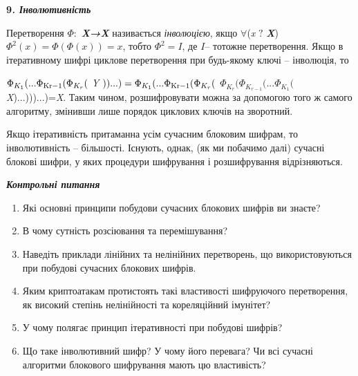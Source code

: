 \documentclass[a4paper]{article}
\newcommand\liststyleWWviiiNumxlviii{%
\renewcommand\theenumi{\arabic{enumi}}
\renewcommand\theenumii{\alph{enumii}}
\renewcommand\theenumiii{\roman{enumiii}}
\renewcommand\theenumiv{\arabic{enumiv}}
\renewcommand\labelenumi{\theenumi.}
\renewcommand\labelenumii{\theenumii.}
\renewcommand\labelenumiii{\theenumiii.}
\renewcommand\labelenumiv{\theenumiv.}
}
\newcounter{}
\newcommand\normalsubformula[1]{\text{\mathversion{normal}$#1$}}
\begin{document}
\bigskip

{\bfseries
9\textit{.  Інволютивність }}

Перетворення  ${\Phi :}$
\textbf{\textit{X}}\textbf{\textit{→}}\textbf{\textit{X}}\textbf{\textit{
}}називається \textit{інволюцією}, якщо  ${\forall }$(\textit{x} ${?}$
\textbf{\textit{X}})\textbf{\textit{ }} ${\Phi ^{{2}}(x)=\Phi (\Phi (x))=x}$,
тобто  ${\Phi ^{{2}}=I}$, де  ${I}$– тотожне перетворення. Якщо в ітеративному
шифрі циклове перетворення при будь-якому ключі – інволюція, то 

 ${\Phi _{{K_{{1}}}}(\text{.}\text{.}\text{.}\Phi
_{\normalsubformula{\text{Kr}}-1}{(\Phi _{K_{{r}}}}{(}}$ \textit{Y}
${))\text{.}\text{.}\text{.})=\Phi _{{K_{{1}}}}(\text{.}\text{.}\text{.}\Phi
_{\normalsubformula{\text{Kr}}-1}{(\Phi _{K_{{r}}}}{(}}$  ${\Phi
_{{K_{{r}}}}(\Phi _{K_{{r-1}}}{(\text{.}\text{.}\text{.}\Phi _{K_{{1}}}}{(}}$
\textit{X})...)))...)=\textit{X}. Таким чином, розшифровувати можна за
допомогою того ж самого алгоритму, змінивши лише порядок циклових ключів на
зворотний.

Якщо ітеративність притаманна усім сучасним блоковим шифрам, то інволютивність –
більшості. Існують, однак, (як ми побачимо далі) сучасні блокові шифри, у яких
процедури шифрування  і розшифрування  відрізняються.


\bigskip

{\centering\bfseries\itshape
Контрольні питання
\par}


\bigskip


\bigskip

\liststyleWWviiiNumxlviii
\begin{enumerate}
\item Які основні принципи побудови сучасних блокових шифрів ви знаєте?
\item В чому сутність розсіювання та перемішування?
\item Наведіть приклади лінійних та нелінійних перетворень, що використовуються
при побудові сучасних блокових шифрів.
\item Яким криптоатакам протистоять такі властивості шифруючого перетворення, як
високий степінь нелінійності та кореляційний імунітет?
\item У чому полягає принцип ітеративності при побудові шифрів?
\item Що таке інволютивний шифр? У чому його перевага? Чи всі сучасні алгоритми
блокового шифрування мають цю властивість?
\end{enumerate}
\end{document}

